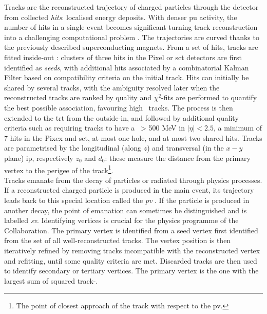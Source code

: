 Tracks are the reconstructed trajectory of charged particles through the detector from collected \textit{hits}: localised energy deposits. With denser \gls{pu} activity, the number of hits in a single event becomes significant turning track reconstruction into a challenging computational problem \cite{ATL-PHYS-PUB-2015-006, ATLAS-tracks-algo,}. The trajectories are curved thanks to the previously described superconducting magnets. From a set of hits, tracks are fitted inside-out \cite{ATLAS-tracks-algo}: clusters of three hits in the Pixel or \gls{sct} detectors are first identified as \textit{seeds}, with additional hits associated by a combinatorial Kalman Filter \cite{10.1115/1.3662552} based on compatibility criteria on the initial track. Hits can initially be shared by several tracks, with the ambiguity resolved later when the reconstructed tracks are ranked by quality and $\chi^2$-fits are performed to quantify the best possible association, favouring high \pt\ tracks. The process is then extended to the \gls{trt} from the outside-in, and followed by additional quality criteria such as requiring tracks to have a \pt\ > 500 MeV in $|\eta| < 2.5$, a minimum of 7 hits in the Pixex and \gls{sct}, at most one hole, and at most two shared hits. Tracks are parametrised by the longitudinal (along $z$) and transversal (in the $x-y$ plane) \gls{ip}, respectively $z_0$ and $d_0$: these measure the distance from the primary vertex to the perigee of the track\footnote{The point of closest approach of the track with respect to the \gls{pv}.}. \\

Tracks emanate from the decay of particles or radiated through physics processes. If a reconstructed charged particle is produced in the main event, its trajectory leads back to this special location called the \textit{pv} \cite{ATLAS:2016nnj}. If the particle is produced in another decay, the point of emanation can sometimes be distinguished and is labelled \textit{\gls{sv}}. Identifying vertices is crucial for the physics programme of the Collaboration. The primary vertex is identified from a seed vertex first identified from the set of all well-reconstructed tracks. The vertex position is then iteratively refined by removing tracks incompatible with the reconstructed vertex and refitting, until some quality criteria are met. Discarded tracks are then used to identify secondary or tertiary vertices. The primary vertex is the one with the largest sum of squared track-\pt. \\

